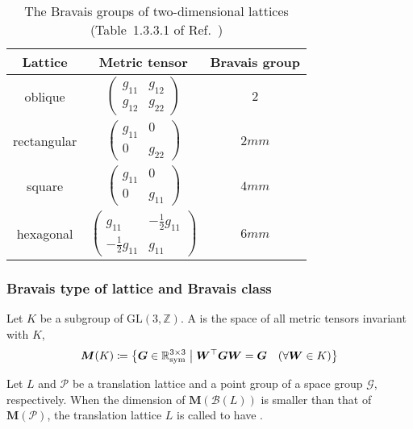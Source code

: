 \begin{table}[htb]
  \centering
  \caption{The Bravais groups of two-dimensional lattices (Table~1.3.3.1 of Ref.~\cite{ITA2016})}
  \label{tab:two-dimensional-Bravais-groups}
  \begin{tabular}{ccc}
    Lattice & Metric tensor & Bravais group \\ \hline
    oblique & $\begin{pmatrix} g_{11} & g_{12} \\ g_{12} & g_{22} \end{pmatrix}$ & $2$ \\
    rectangular & $\begin{pmatrix} g_{11} & 0 \\ 0 & g_{22} \end{pmatrix}$ & $2mm$ \\
    square & $\begin{pmatrix} g_{11} & 0 \\ 0 & g_{11} \end{pmatrix}$ & $4mm$ \\
    hexagonal & $\begin{pmatrix} g_{11} & -\frac{1}{2} g_{11} \\ -\frac{1}{2} g_{11} & g_{11} \end{pmatrix}$ & $6mm$ \\
  \end{tabular}
\end{table}

\subsubsection{Bravais type of lattice and Bravais class}

\begin{screen}
  \begin{defn}
    Let $K$ be a subgroup of $\mathrm{GL}(3, \mathbb{Z})$.
    A  is the space of all metric tensors invariant with $K$,
    \begin{align}
      \bm{M}( K ) \coloneqq \left\{  \bm{G} \in \mathbb{R}^{3 \times 3}_{\mathrm{sym}}  \mathrel{}\middle|\mathrel{}  \bm{W}^{\top}\bm{G}\bm{W} = \bm{G} \quad (\forall \bm{W} \in K )  \right\}
    \end{align}
  \end{defn}
\end{screen}

Let $L$ and $\mathcal{P}$ be a translation lattice and a point group of a space group $\mathcal{G}$, respectively.
When the dimension of $\bm{M}(\mathcal{B}(L))$ is smaller than that of $\bm{M}(\mathcal{P})$, the translation lattice $L$ is called to have .

